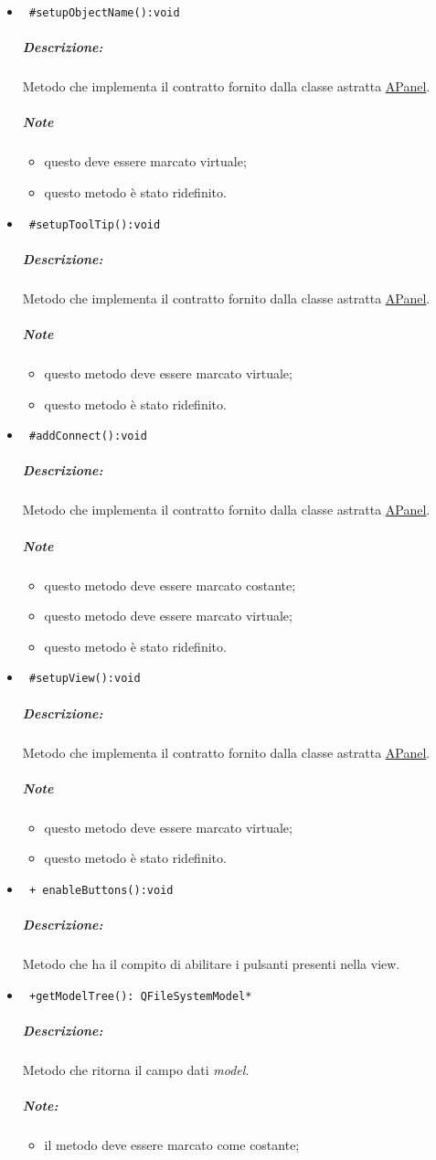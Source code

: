 \begin{itemize}
\item\color{blue}\verb! #setupObjectName():void!

\color{black}
\subparagraph{Descrizione:} Metodo che implementa il contratto fornito dalla classe astratta \hyperref[speAPanel]{APanel}.
 \subparagraph{Note}
 \begin{itemize}
  \item questo deve essere marcato virtuale;
 \item questo metodo è stato ridefinito.
 \end{itemize}
 
\item\color{blue}\verb! #setupToolTip():void!

\color{black}
\subparagraph{Descrizione:} Metodo che implementa il contratto fornito dalla classe astratta \hyperref[speAPanel]{APanel}.
 \subparagraph{Note}
 \begin{itemize}
 \item questo metodo deve essere marcato virtuale;
 \item questo metodo è stato ridefinito.
 \end{itemize}
 
\item\color{blue}\verb! #addConnect():void!

\color{black}
\subparagraph{Descrizione:} Metodo che implementa il contratto fornito dalla classe astratta \hyperref[speAPanel]{APanel}.
 \subparagraph{Note}
 \begin{itemize}
 \item questo metodo deve essere marcato costante;
 \item questo metodo deve essere marcato virtuale;
 \item questo metodo è stato ridefinito.
 \end{itemize}
 
\item\color{blue}\verb! #setupView():void!
\color{black}
\subparagraph{Descrizione:} Metodo che implementa il contratto fornito dalla classe astratta \hyperref[speAPanel]{APanel}.
 \subparagraph{Note}
 \begin{itemize}
 \item questo metodo deve essere marcato virtuale;
 \item questo metodo è stato ridefinito.
 \end{itemize}
\color{black}

\item\color{blue}\verb! + enableButtons():void!
\color{black}
\subparagraph{Descrizione:} Metodo che ha il compito di abilitare i pulsanti presenti nella view.
\color{black}
\item\color{blue}\verb! +getModelTree(): QFileSystemModel*!
\color{black}
\subparagraph{Descrizione:} Metodo che ritorna il campo dati \emph{model}.
\subparagraph{Note:}
\begin{itemize}
\item il metodo deve essere marcato come costante;
\end{itemize}


\end{itemize}
